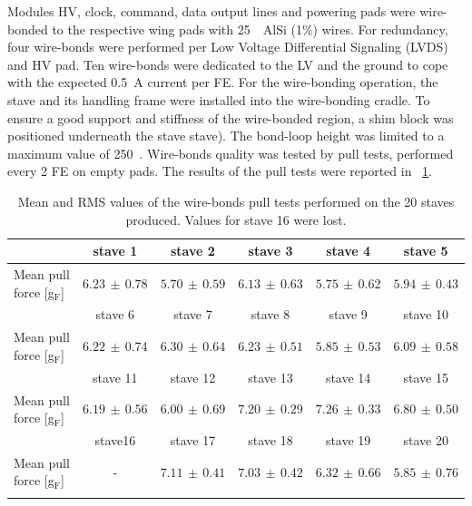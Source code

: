 Modules HV, clock, command, data output lines and powering pads were wire-bonded to the respective wing pads with 25~\microm\ AlSi (1\%) wires. For redundancy, four wire-bonds were performed per Low Voltage Differential Signaling (LVDS) and HV pad. Ten wire-bonds were dedicated to the LV and the ground to cope with the expected 0.5~A current per FE. 
For the wire-bonding operation, the stave and its handling frame were installed into the wire-bonding cradle. To ensure a good support and stiffness of the wire-bonded region, a shim block was positioned underneath the stave stave). The bond-loop height was limited to a maximum value of 250~\microm. Wire-bonds quality was tested by pull tests, performed every 2 FE on empty pads. The results of the pull tests were reported in ~\ref{table:wire-bond}.
\begin{table}
	\centering
	\begin{tabular}{|l|c|c|c|c|c|}
  		\cline{2-6}
		\multicolumn{1}{r|}{} & stave 1 & stave 2 & stave 3 & stave 4 & stave 5 \\
  		\hline
		Mean pull force [g$_{\mathrm F}$] & $6.23 \, \pm \, 0.78 $ & $5.70 \, \pm \, 0.59 $ & $6.13 \, \pm \, 0.63 $ & $5.75 \, \pm \, 0.62 $ & $5.94 \, \pm \, 0.43 $ \\
		\hline
		\noalign{\smallskip}
  		\cline{2-6}
		\multicolumn{1}{r|}{}  & stave 6 & stave 7 & stave 8 & stave 9 & stave 10 \\
  		\hline
		Mean pull force [g$_{\mathrm F}$] & $6.22 \, \pm \, 0.74 $ & $6.30 \, \pm \, 0.64$ & $6.23 \, \pm \, 0.51 $ & $5.85 \, \pm \, 0.53 $ & $6.09 \, \pm \, 0.58$ \\
		\hline
		\noalign{\smallskip}

  		\cline{2-6}
		\multicolumn{1}{r|}{}  & stave 11 & stave 12 & stave 13 & stave 14 & stave 15 \\
  		\hline
		Mean pull force [g$_{\mathrm F}$] & $6.19 \, \pm \, 0.56$ & $6.00 \, \pm \, 0.69$ & $7.20 \, \pm \, 0.29$ & $7.26 \, \pm \, 0.33$ & $6.80 \, \pm \, 0.50$ \\
		\hline
		\noalign{\smallskip}

  		\cline{2-6}
		\multicolumn{1}{r|}{}  & stave16 & stave 17 & stave 18 & stave 19 & stave 20 \\
  		\hline
		Mean pull force [g$_{\mathrm F}$] & - & $7.11 \, \pm \, 0.41$ & $7.03 \, \pm \, 0.42$ & $ 6.32 \, \pm \, 0.66 $ & $5.85 \, \pm \, 0.76$ \\
		\hline
		\noalign{\smallskip}
	\end{tabular}
	\caption[Table caption text]{Mean and RMS values of the wire-bonds pull tests performed on the 20 staves produced. Values for stave 16 were lost.}
	\label{table:wire-bond}
\end{table}

